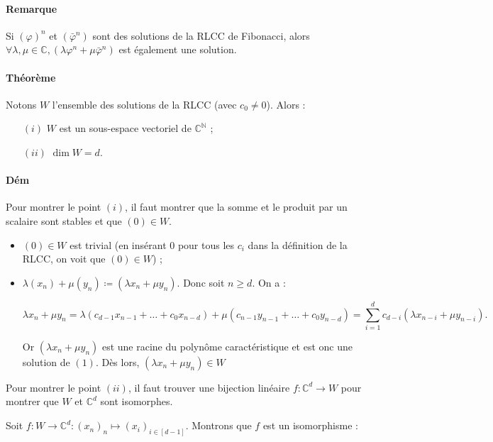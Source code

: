 \documentclass{article}
\begin{document}
			\paragraph{Remarque} Si $(\varphi)^n$ et $(\bar\varphi^n)$ sont des solutions de la RLCC de Fibonacci, alors $\forall \lambda, \mu \in \mathbb C, (\lambda\varphi^n + \mu\bar\varphi^n)$ est
			également une solution.

			\paragraph{Théorème} Notons $W$ l'ensemble des solutions de la RLCC (avec $c_0 \neq 0$). Alors :

			\begin{itemize}
				\item[$(i)$] $W$ est un sous-espace vectoriel de $\mathbb C^{\mathbb N}$ ;
				\item[$(ii)$] $\dim W = d$.
			\end{itemize}

			\paragraph{Dém} Pour montrer le point $(i)$, il faut montrer que la somme et le produit par un scalaire sont stables et que $(0) \in W$.
			\begin{itemize}
				\item $(0) \in W$ est trivial (en insérant $0$ pour tous les $c_i$ dans la définition de la RLCC, on voit que $(0) \in W$) ;
				\item $\lambda(x_n) + \mu(y_n) \coloneqq (\lambda x_n + \mu y_n)$. Donc soit $n \geq d$. On a :

				\[\lambda x_n + \mu y_n = \lambda (c_{d-1}x_{n-1} + \ldots + c_0x_{n-d}) + \mu (c_{n-1}y_{n-1} + \ldots + c_0y_{n-d}) = \sum_{i=1}^dc_{d-i}(\lambda x_{n-i} + \mu y_{n-i}).\]

				Or $(\lambda x_n + \mu y_n)$ est une racine du polynôme caractéristique et est onc une solution de $(1)$. Dès lors, $(\lambda x_n + \mu y_n) \in W$
			\end{itemize}

			Pour montrer le point $(ii)$, il faut trouver une bijection linéaire $f : \mathbb C^d \to W$ pour montrer que $W$ et $\mathbb C^d$ sont isomorphes.

			Soit $f : W \to \mathbb C^d : (x_n)_n \mapsto(x_i)_{i\in[d-1]}$. Montrons que $f$ est un isomorphisme :
\end{document}
